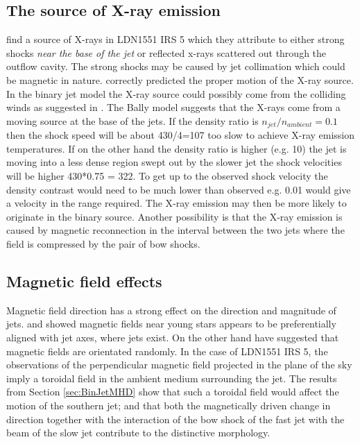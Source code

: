 \subsection{The source of X-ray emission}
\citet{2003ApJ...584..843B} find a source of X-rays in LDN1551 IRS 5 which they attribute to
either strong shocks \emph{near the base of the jet} or reflected x-rays scattered out through the outflow cavity.
The strong shocks may be caused by jet collimation which could be magnetic in nature. 
\citet{2004A&A...424L...1B} correctly predicted the proper motion of the X-ray source.
In the binary jet model the X-ray source could possibly come from the colliding winds as
suggested in \citet{2003ApJ...584..843B}.
The Bally model suggests that the X-rays come from a moving source at the base
of the jets. If the density ratio is $n_{jet}/n_{ambient}=0.1$ then the shock speed
will be about 430/4=107 too slow to achieve X-ray emission temperatures. If on
the other hand the density ratio is higher (e.g. 10) the jet is moving into a less
dense region swept out by the slower jet the shock velocities will be higher
430*0.75 = 322. To get up to the observed shock velocity the density contrast would
need to be much lower than observed e.g. 0.01 would give a velocity in the range required.
The X-ray emission may then be more likely to originate in the binary source.
Another possibility is that the X-ray emission is caused by magnetic reconnection in the
interval between the two jets where the field is compressed by the pair of bow
shocks. 


\subsection{Magnetic field effects}
Magnetic field direction has a strong effect on the direction and magnitude of jets.
\citet{1986ApJS...62...39S} and \citet{1989AJ.....98.1368T} showed magnetic fields near young stars appears to be preferentially aligned with jet axes, where jets exist. 
On the other hand \citet{2004A&A...425..973M} have 
suggested that magnetic fields are orientated randomly.
In the case of LDN1551 IRS 5, the observations of the perpendicular magnetic
field projected in the plane of the sky imply a toroidal field in the ambient medium surrounding the jet. 
The results from Section \ref{sec:BinJetMHD} show that such a toroidal field would affect the motion of the southern jet; and
that both the magnetically driven change in direction together with the interaction
of the bow shock of the fast jet with the beam of the slow jet contribute to the
distinctive morphology.

